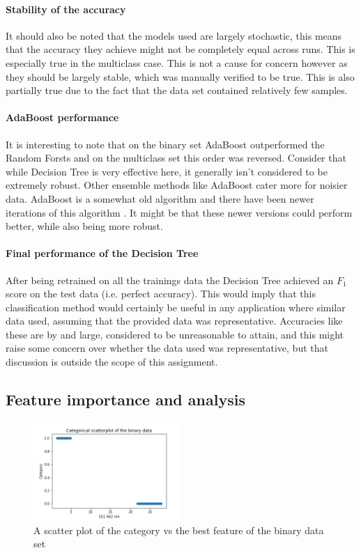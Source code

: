 \documentclass[british]{article}
\begin{document}
	\paragraph{Stability of the accuracy} It should also be noted that the models used are largely stochastic, this means that the accuracy they achieve might not be completely equal across runs. This is especially true in the multiclass case. This is not a cause for concern however as they should be largely stable, which was manually verified to be true. This is also partially true due to the fact that the data set contained relatively few samples. 
	
	\paragraph{AdaBoost performance} It is interesting to note that on the binary set AdaBoost outperformed the Random Forsts and on the multiclass set this order was reversed. Consider that while Decision Tree is very effective here, it generally isn't considered to be extremely robust. Other ensemble methods like AdaBoost cater more for noisier data. AdaBoost is a somewhat old algorithm \autocite{Freund1997} and there have been newer iterations of this algorithm \autocite{NormalHedge, Otten2016, Vente2016}. It might be that these newer versions could perform better, while also being more robust.  
	
	\paragraph{Final performance of the Decision Tree}After being retrained on all the trainings data the Decision Tree achieved an $F_1$ score on the test data (i.e. perfect accuracy). This would imply that this classification method would certainly be useful in any application where similar data used, assuming that the provided data was representative. Accuracies like these are by and large, considered to be unreasonable to attain, and this might raise some concern over whether the data used was representative, but that discussion is outside the scope of this assignment.
	
	\subsection{Feature importance and analysis}
	
	\begin{figure}[!ht]
		\centering
		\includegraphics[width=0.5\textwidth]{binaryScatterplot}
		\caption{A scatter plot of the category vs the best feature of the binary data set}
		\label{binaryScatterplot}
	\end{figure}
	
\end{document}
